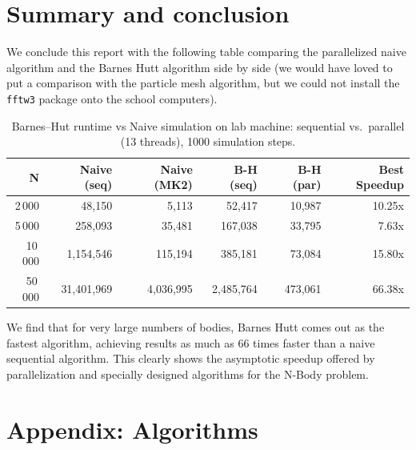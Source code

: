 \documentclass{article}
\begin{document}
\section{Summary and conclusion}

We conclude this report with the following table comparing the parallelized naive algorithm and the Barnes Hutt algorithm side by side (we would have loved to put a comparison with the particle mesh algorithm, but we could not install the \texttt{fftw3} package onto the school computers).

\begin{table}[H]
    \centering
    \begin{tabular}{|r|r|r|r|r|r|}
    \hline
    \textbf{N} & \textbf{Naive (seq)} & \textbf{Naive (MK2)} & \textbf{B-H (seq)} & \textbf{B-H (par)} & \textbf{Best Speedup} \\
    \hline
    2\,000 & 48,150 & 5,113 & 52,417 & 10,987  &  10.25x\\ 
    5\,000 & 258,093 & 35,481 & 167,038 & 33,795 &  7.63x\\ 
    10\,000& 1,154,546 & 115,194 & 385,181 & 73,084&  15.80x \\ 
    50\,000& 31,401,969 & 4,036,995 & 2,485,764 & 473,061& 66.38x  \\ 
    \hline
    \end{tabular}
    \caption{Barnes–Hut runtime vs Naive simulation on lab machine: sequential vs.\, parallel (13 threads), 1000 simulation steps.}
    \label{tab:bh_seq_vs_par}
\end{table}

We find that for very large numbers of bodies, Barnes Hutt comes out as the fastest algorithm, achieving results as much as 66 times faster than a naive sequential algorithm. This clearly shows the asymptotic speedup offered by parallelization and specially designed algorithms for the N-Body problem.








\appendix
\newpage
\section{Appendix: Algorithms}
\end{document}
